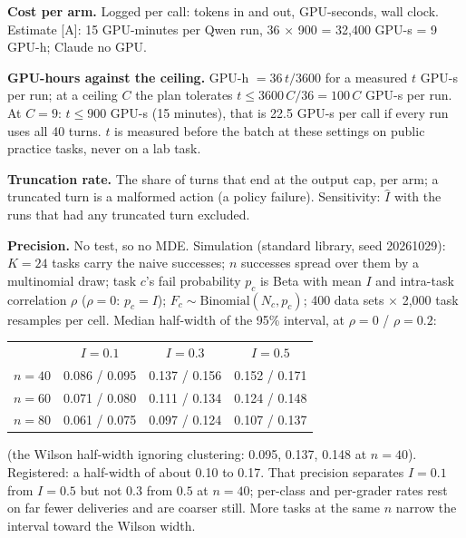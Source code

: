 \documentclass[11pt]{article}
\begin{document}
\begin{answer}
\textbf{Cost per arm.} Logged per call: tokens in and out, GPU-seconds, wall
clock. Estimate [A]: 15 GPU-minutes per Qwen run, 36 $\times$ 900 = 32,400
GPU-s = 9 GPU-h; Claude no GPU.

\textbf{GPU-hours against the ceiling.} GPU-h $= 36\,t / 3600$ for a measured
$t$ GPU-s per run; at a ceiling $C$ the plan tolerates $t \le 3600\,C / 36 =
100\,C$ GPU-s per run. At $C = 9$: $t \le 900$ GPU-s (15 minutes), that is
22.5 GPU-s per call if every run uses all 40 turns. $t$ is measured before the
batch at these settings on public practice tasks, never on a lab task.

\textbf{Truncation rate.} The share of turns that end at the output cap, per
arm; a truncated turn is a malformed action (a policy failure). Sensitivity:
$\hat I$ with the runs that had any truncated turn excluded.

\textbf{Precision.} No test, so no MDE. Simulation (standard library, seed
20261029): $K = 24$ tasks carry the naive successes; $n$ successes spread over
them by a multinomial draw; task $c$'s fail probability $p_c$ is Beta with mean
$I$ and intra-task correlation $\rho$ ($\rho = 0$: $p_c = I$); $F_c \sim
\mathrm{Binomial}(N_c, p_c)$; 400 data sets $\times$ 2,000 task resamples per
cell. Median half-width of the 95\% interval, at $\rho = 0$ / $\rho = 0.2$:
\begin{center}
\begin{tabular}{lccc}
 & $I = 0.1$ & $I = 0.3$ & $I = 0.5$ \\
$n = 40$ & 0.086 / 0.095 & 0.137 / 0.156 & 0.152 / 0.171 \\
$n = 60$ & 0.071 / 0.080 & 0.111 / 0.134 & 0.124 / 0.148 \\
$n = 80$ & 0.061 / 0.075 & 0.097 / 0.124 & 0.107 / 0.137 \\
\end{tabular}
\end{center}
(the Wilson half-width ignoring clustering: 0.095, 0.137, 0.148 at $n = 40$).
Registered: a half-width of about 0.10 to 0.17. That precision separates
$I = 0.1$ from $I = 0.5$ but not $0.3$ from $0.5$ at $n = 40$; per-class and
per-grader rates rest on far fewer deliveries and are coarser still. More
tasks at the same $n$ narrow the interval toward the Wilson width.


\end{answer}
\end{document}
